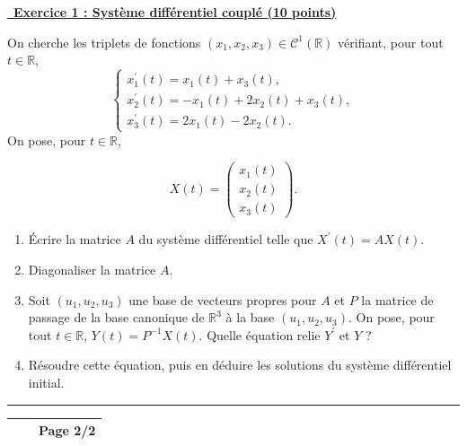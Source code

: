 \vspace{2em}

\underline {\, \bf{Exercice 1 : Système différentiel couplé } \bf{(10 points)}}
\medskip

On cherche les triplets de fonctions $\left(x_1, x_2, x_3\right) \in \mathcal{C}^1(\mathbb{R})$ vérifiant, pour tout $t \in \mathbb{R}$,
\[
\left\{\begin{array}{l}
x_1^{\prime}(t)=x_1(t)+x_3(t), \\
x_2^{\prime}(t)=-x_1(t)+2 x_2(t)+x_3(t), \\
x_3^{\prime}(t)=2 x_1(t)-2 x_2(t).
\end{array}\right.
\]
On pose, pour $t \in \mathbb{R}$,

$$
X(t)=\left(\begin{array}{l}
x_1(t) \\
x_2(t) \\
x_3(t)
\end{array}\right) .
$$


\begin{enumerate}
    \item Écrire la matrice $A$ du système différentiel telle que $X^{\prime}(t)=A X(t)$.
    \item Diagonaliser la matrice $A$.
    \item Soit $\left(u_1, u_2, u_3\right)$ une base de vecteurs propres pour $A$ et $P$ la matrice de passage de la base canonique de $\mathbb{R}^3$ à la base $(u_1, u_2, u_3)$. On pose, pour tout $t \in \mathbb{R}$, $Y(t)=P^{-1} X(t)$. Quelle équation relie $Y^{\prime}$ et $Y$ ?
    \item Résoudre cette équation, puis en déduire les solutions du système différentiel initial.
\end{enumerate}

\hfill\break
\hrule
\hfill\break
\newpage

\begin{center}
    \renewcommand{\arraystretch}{1.5} 
    \begin{tabular}{|>{\centering\arraybackslash}m{4cm}|>{\centering\arraybackslash}m{6cm}|>{\centering\arraybackslash}m{4cm}|}
        \hline
            \hspace{4cm}&\hspace{6cm} & \textbf{Page 2/2}\\
            \hline
    \end{tabular}
\end{center}


\vspace{1em}

